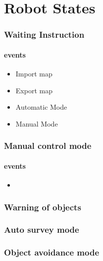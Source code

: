 \documentclass[10pt,a4paper]{article}
\begin{document}
\part{Robot States}
\section{Waiting Instruction}
\subsection{events}
\begin{itemize}
\item Import map
\item Export map
\item Automatic Mode
\item Manual Mode	
\end{itemize}
\section{Manual control mode}
\subsection {events}
\begin{itemize}
\item 
\end{itemize}
\section{Warning of objects}
\section{Auto survey mode}
\section{Object avoidance mode}
\end{document}
